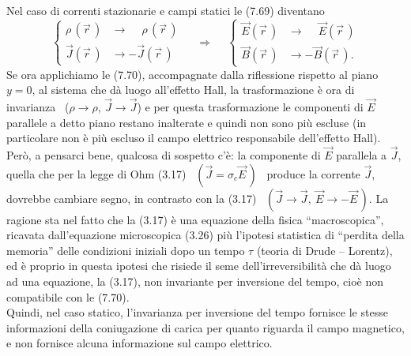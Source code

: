 Nel caso di correnti stazionarie e campi statici le (7.69) diventano
\begin{equation}
  \left\{\begin{aligned}
    \rho\,(\vec r\,)&\to\phantom{-}\rho\,(\vec r\,)\\
    \vec J(\vec r\,)&\to-\vec J(\vec r\,)
  \end{aligned}\right.
  \quad\ \Rightarrow\quad\
  \left\{\begin{aligned}
    \vec E(\vec r\,)&\to\phantom{-}\vec E(\vec r\,)\\
    \vec B(\vec r\,)&\to-\vec B(\vec r\,).
  \end{aligned}\right.
  \tag{7.70}
\end{equation}
Se ora applichiamo le (7.70), accompagnate dalla riflessione rispetto al piano
$y=0$, al sistema che d\`a luogo all'effetto Hall, la trasformazione \`e ora di
invarianza \ ($\rho\to\rho$, $\vec J\to\vec J$) e per questa trasformazione le
componenti di $\vec E$ parallele a detto piano restano
inalterate e quindi non sono pi\`u escluse (in particolare non \`e pi\`u escluso
il campo elettrico responsabile dell'effetto Hall).\\
Per\`o, a pensarci bene, qualcosa di sospetto c'\`e: la componente di $\vec E$
parallela a $\vec J$, quella che per la legge di Ohm (3.17)
\ $(\vec J=\sigma_c\vec E\,)$ \ produce la corrente $\vec J$, dovrebbe cambiare
segno, in contrasto con la (3.17) \ $(\vec J\to\vec J,\ \vec E\to-\vec E\,)$. La
ragione sta nel fatto che la (3.17) \`e una equazione della fisica
``macroscopica'', ricavata dall'equazione microscopica (3.26) pi\`u l'ipotesi
statistica di ``perdita della memoria'' delle condizioni iniziali dopo un tempo
$\tau$ (teoria di Drude -- Lorentz), ed \`e proprio in questa ipotesi che
risiede il seme dell'irreversibilit\`a che d\`a luogo ad una equazione, la
(3.17), non invariante per inversione del tempo, cio\`e non compatibile con le
(7.70).\\
Quindi, nel caso statico, l'invarianza per inversione del tempo fornisce le
stesse informazioni della coniugazione di carica per quanto riguarda il campo
magnetico, e non fornisce alcuna informazione sul campo elettrico.
